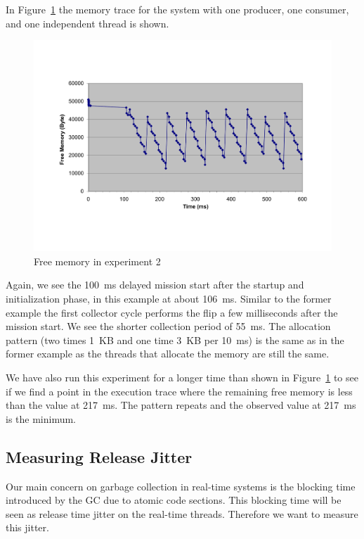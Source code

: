 In Figure~\ref{fig:ex2:mem} the memory trace for the system with one
producer, one consumer, and one independent thread is shown.
\begin{figure}
\begin{center}
    \includegraphics[width=\excelwidth]{jvm/gc_ex2}
    \caption{Free memory in experiment 2}
\label{fig:ex2:mem}
\end{center}
\end{figure}
%
Again, we see the 100~ms delayed mission start after the startup and
initialization phase, in this example at about 106~ms. Similar to
the former example the first collector cycle performs the flip a few
milliseconds after the mission start. We see the shorter collection
period of 55~ms. The allocation pattern (two times 1~KB and one time
3~KB per 10~ms) is the same as in the former example as the threads
that allocate the memory are still the same.

We have also run this experiment for a longer time than shown in
Figure~\ref{fig:ex2:mem} to see if we find a point in the execution
trace where the remaining free memory is less than the value at
217~ms. The pattern repeats and the observed value at 217~ms is the
minimum.




\subsection{Measuring Release Jitter}


Our main concern on garbage collection in real-time systems is the
blocking time introduced  by the GC due to atomic code sections.
This blocking time will be seen as release time jitter on the
real-time threads. Therefore we want to measure this jitter.

